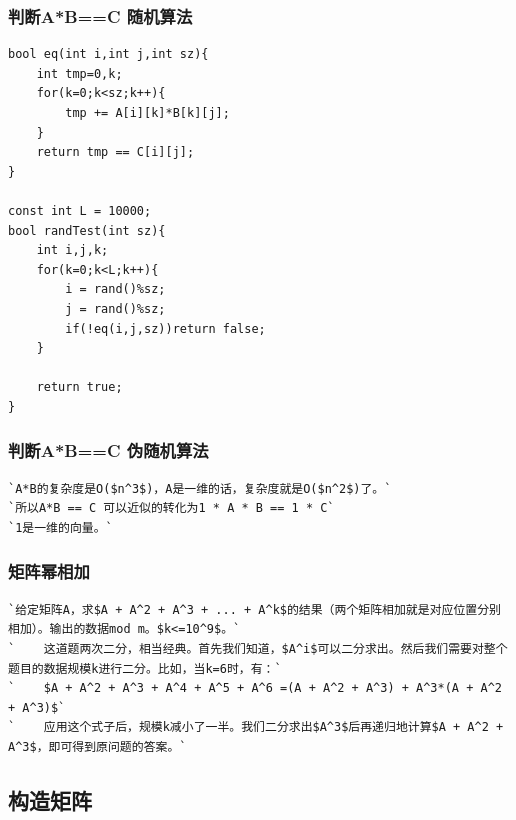 \documentclass[a4paper]{article}
\begin{document}
\begin{CJK*}{UTF8}{gbsn}
\begin{multicols}{3}
\begin{flushleft}
\subsubsection{判断A*B==C 随机算法}
\begin{lstlisting}
bool eq(int i,int j,int sz){
    int tmp=0,k;
    for(k=0;k<sz;k++){
        tmp += A[i][k]*B[k][j];
    }
    return tmp == C[i][j];
}

const int L = 10000;
bool randTest(int sz){
    int i,j,k;
    for(k=0;k<L;k++){
        i = rand()%sz;
        j = rand()%sz;
        if(!eq(i,j,sz))return false;
    }

    return true;
}
\end{lstlisting}

\subsubsection{判断A*B==C 伪随机算法}
\begin{lstlisting}
`A*B的复杂度是O($n^3$)，A是一维的话，复杂度就是O($n^2$)了。`
`所以A*B == C 可以近似的转化为1 * A * B == 1 * C`
`1是一维的向量。`
\end{lstlisting}

\subsubsection{矩阵幂相加}
\begin{lstlisting}
`给定矩阵A，求$A + A^2 + A^3 + ... + A^k$的结果（两个矩阵相加就是对应位置分别相加）。输出的数据mod m。$k<=10^9$。`
`    这道题两次二分，相当经典。首先我们知道，$A^i$可以二分求出。然后我们需要对整个题目的数据规模k进行二分。比如，当k=6时，有：`
`    $A + A^2 + A^3 + A^4 + A^5 + A^6 =(A + A^2 + A^3) + A^3*(A + A^2 + A^3)$`
`    应用这个式子后，规模k减小了一半。我们二分求出$A^3$后再递归地计算$A + A^2 + A^3$，即可得到原问题的答案。`
\end{lstlisting}

\subsection{构造矩阵}


\end{flushleft}
\end{multicols}
\end{CJK*}
\end{document}
